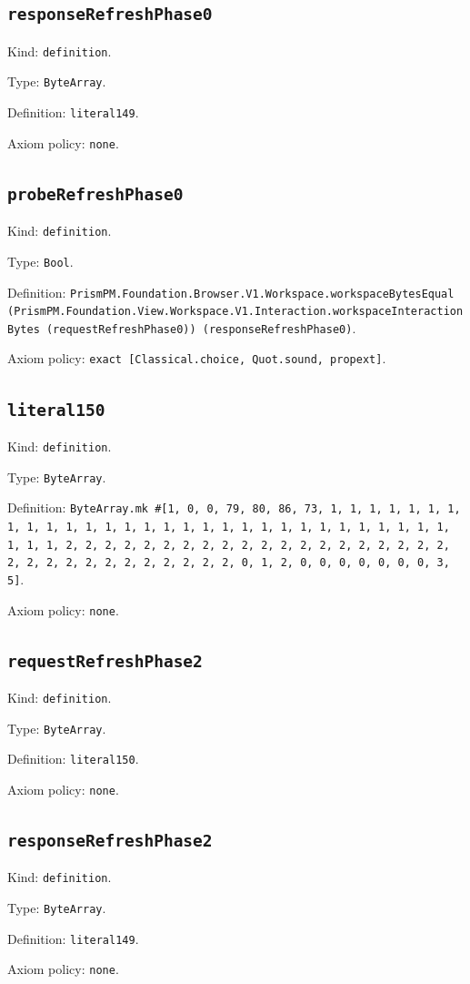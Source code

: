 \documentclass[11pt]{article}
\begin{document}
\subsection*{\texttt{responseRefreshPhase0}}
\noindent Kind: \texttt{definition}.\par
\noindent Type: \texttt{ByteArray}.\par
\noindent Definition: \texttt{literal149}.\par
\noindent Axiom policy: \texttt{none}.\par
\subsection*{\texttt{probeRefreshPhase0}}
\noindent Kind: \texttt{definition}.\par
\noindent Type: \texttt{Bool}.\par
\noindent Definition: \texttt{PrismPM.Foundation.Browser.V1.Workspace.workspaceBytesEqual (PrismPM.Foundation.View.Workspace.V1.Interaction.workspaceInteractionBytes (requestRefreshPhase0)) (responseRefreshPhase0)}.\par
\noindent Axiom policy: \texttt{exact [Classical.choice, Quot.sound, propext]}.\par
\subsection*{\texttt{literal150}}
\noindent Kind: \texttt{definition}.\par
\noindent Type: \texttt{ByteArray}.\par
\noindent Definition: \texttt{ByteArray.mk \#[1, 0, 0, 79, 80, 86, 73, 1, 1, 1, 1, 1, 1, 1, 1, 1, 1, 1, 1, 1, 1, 1, 1, 1, 1, 1, 1, 1, 1, 1, 1, 1, 1, 1, 1, 1, 1, 1, 1, 1, 2, 2, 2, 2, 2, 2, 2, 2, 2, 2, 2, 2, 2, 2, 2, 2, 2, 2, 2, 2, 2, 2, 2, 2, 2, 2, 2, 2, 2, 2, 2, 2, 0, 1, 2, 0, 0, 0, 0, 0, 0, 0, 3, 5]}.\par
\noindent Axiom policy: \texttt{none}.\par
\subsection*{\texttt{requestRefreshPhase2}}
\noindent Kind: \texttt{definition}.\par
\noindent Type: \texttt{ByteArray}.\par
\noindent Definition: \texttt{literal150}.\par
\noindent Axiom policy: \texttt{none}.\par
\subsection*{\texttt{responseRefreshPhase2}}
\noindent Kind: \texttt{definition}.\par
\noindent Type: \texttt{ByteArray}.\par
\noindent Definition: \texttt{literal149}.\par
\noindent Axiom policy: \texttt{none}.\par
\end{document}
